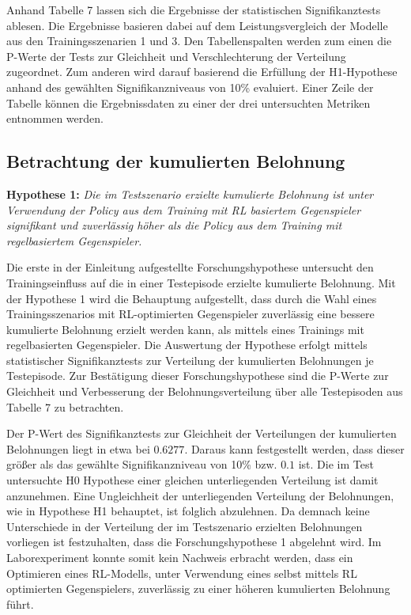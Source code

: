 Anhand Tabelle 7 lassen sich die Ergebnisse der statistischen Signifikanztests ablesen.
Die Ergebnisse basieren dabei auf dem Leistungsvergleich der Modelle aus den Trainingsszenarien 1 und 3.
Den Tabellenspalten werden zum einen die P-Werte der Tests zur Gleichheit und Verschlechterung der Verteilung zugeordnet.
Zum anderen wird darauf basierend die Erfüllung der H1-Hypothese anhand des gewählten Signifikanzniveaus von 10\% evaluiert.
Einer Zeile der Tabelle können die Ergebnissdaten zu einer der drei untersuchten Metriken entnommen werden.

\subsection{Betrachtung der kumulierten Belohnung}

\textbf{Hypothese 1:}
\textit{Die im Testszenario erzielte kumulierte Belohnung ist unter Verwendung der Policy aus dem Training mit RL basiertem Gegenspieler signifikant und zuverlässig höher als die Policy aus dem Training mit regelbasiertem Gegenspieler.}

Die erste in der Einleitung aufgestellte Forschungshypothese untersucht den Trainingseinfluss auf die in einer Testepisode erzielte kumulierte Belohnung.
Mit der Hypothese 1 wird die Behauptung aufgestellt, dass durch die Wahl eines Trainingsszenarios mit RL-optimierten Gegenspieler zuverlässig eine bessere kumulierte Belohnung erzielt werden kann, als mittels eines Trainings mit regelbasierten Gegenspieler.
Die Auswertung der Hypothese erfolgt mittels statistischer Signifikanztests zur Verteilung der kumulierten Belohnungen je Testepisode.
Zur Bestätigung dieser Forschungshypothese sind die P-Werte zur Gleichheit und Verbesserung der Belohnungsverteilung über alle Testepisoden aus Tabelle 7 zu betrachten. 

Der P-Wert des Signifikanztests zur Gleichheit der Verteilungen der kumulierten Belohnungen liegt in etwa bei $0.6277$.
Daraus kann festgestellt werden, dass dieser größer als das gewählte Signifikanzniveau von 10\% bzw. $0.1$ ist.
Die im Test untersuchte H0 Hypothese einer gleichen unterliegenden Verteilung ist damit anzunehmen.
Eine Ungleichheit der unterliegenden Verteilung der Belohnungen, wie in Hypothese H1 behauptet, ist folglich abzulehnen.
Da demnach keine Unterschiede in der Verteilung der im Testszenario erzielten Belohnungen vorliegen ist festzuhalten, dass die Forschungshypothese 1 abgelehnt wird.
Im Laborexperiment konnte somit kein Nachweis erbracht werden, dass ein Optimieren eines RL-Modells, unter Verwendung eines selbst mittels RL optimierten Gegenspielers, zuverlässig zu einer höheren kumulierten Belohnung führt.

